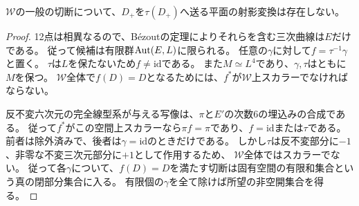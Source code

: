 \begin{lemma}\label{lem:elliptic-nonperiod}
$\mathcal W$の一般の切断について、$D_+$を$\tau(D_+)$へ送る平面の射影変換は存在しない。
\end{lemma}
\begin{proof}
12点は相異なるので、B\'ezoutの定理によりそれらを含む三次曲線は$E$だけである。
従って候補は有限群$\operatorname{Aut}(E,L)$に限られる。
任意の$\gamma$に対して$f=\tau^{-1}\gamma$と置く。
$\tau$は$L$を保たないため$f\ne\mathrm{id}$である。
また$M\simeq L^4$であり、$\gamma,\tau$はともに$M$を保つ。
$\mathcal W$全体で$f(D)=D$となるためには、$f^*$が$\mathcal W$上スカラーでなければならない。

反不変六次元の完全線型系が与える写像は、$\pi$と$E'$の次数6の埋込みの合成である。
従って$f^*$がこの空間上スカラーなら$\pi f=\pi$であり、$f=\mathrm{id}$または$\tau$である。
前者は除外済みで、後者は$\gamma=\mathrm{id}$のときだけである。
しかし$\tau$は反不変部分に$-1$、非零な不変三次元部分に$+1$として作用するため、
$\mathcal W$全体ではスカラーでない。
従って各$\gamma$について、$f(D)=D$を満たす切断は固有空間の有限和集合という真の閉部分集合に入る。
有限個の$\gamma$を全て除けば所望の非空開集合を得る。
\end{proof}

